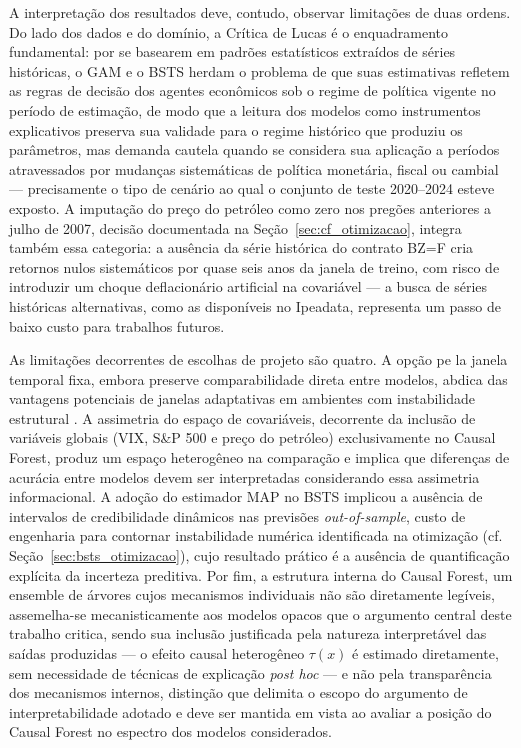 \documentclass[	12pt, Times, openright, oneside, a4paper, english, brazil]{abntex2}
\begin{document}
A interpretação dos resultados deve, contudo, observar limitações de duas ordens. Do lado dos dados e do domínio, a Crítica de Lucas \cite{lucas1976critique} é o enquadramento fundamental: por se basearem em padrões estatísticos extraídos de séries históricas, o GAM e o BSTS herdam o problema de que suas estimativas refletem as regras de decisão dos agentes econômicos sob o regime de política vigente no período de estimação, de modo que a leitura dos modelos como instrumentos explicativos preserva sua validade para o regime histórico que produziu os parâmetros, mas demanda cautela quando se considera sua aplicação a períodos atravessados por mudanças sistemáticas de política monetária, fiscal ou cambial — precisamente o tipo de cenário ao qual o conjunto de teste 2020--2024 esteve exposto. A imputação do preço do petróleo como zero nos pregões anteriores a julho de 2007, decisão documentada na Seção~\ref{sec:cf_otimizacao}, integra também essa categoria: a ausência da série histórica do contrato BZ=F cria retornos nulos sistemáticos por quase seis anos da janela de treino, com risco de introduzir um choque deflacionário artificial na covariável — a busca de séries históricas alternativas, como as disponíveis no Ipeadata, representa um passo de baixo custo para trabalhos futuros.

As limitações decorrentes de escolhas de projeto são quatro. A opção pe la janela temporal fixa, embora preserve comparabilidade direta entre modelos, abdica das vantagens potenciais de janelas adaptativas em ambientes com instabilidade estrutural \cite{inoue2017rolling}. A assimetria do espaço de covariáveis, decorrente da inclusão de variáveis globais (VIX, S\&P 500 e preço do petróleo) exclusivamente no Causal Forest, produz um espaço heterogêneo na comparação e implica que diferenças de acurácia entre modelos devem ser interpretadas considerando essa assimetria informacional. A adoção do estimador MAP no BSTS implicou a ausência de intervalos de credibilidade dinâmicos nas previsões \textit{out-of-sample}, custo de engenharia para contornar instabilidade numérica identificada na otimização (cf. Seção~\ref{sec:bsts_otimizacao}), cujo resultado prático é a ausência de quantificação explícita da incerteza preditiva. Por fim, a estrutura interna do Causal Forest, um ensemble de árvores cujos mecanismos individuais não são diretamente legíveis, assemelha-se mecanisticamente aos modelos opacos que o argumento central deste trabalho critica, sendo sua inclusão justificada pela natureza interpretável das saídas produzidas — o efeito causal heterogêneo $\tau(x)$ é estimado diretamente, sem necessidade de técnicas de explicação \textit{post hoc} — e não pela transparência dos mecanismos internos, distinção que delimita o escopo do argumento de interpretabilidade adotado e deve ser mantida em vista ao avaliar a posição do Causal Forest no espectro dos modelos considerados.
\end{document}

